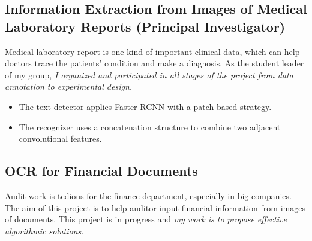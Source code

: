 \documentclass[12pt,letterpaper]{report}
\newcommand{\listitemspace}{0.15em}%
\newenvironment{desp}
{\begin{list}{}{\setlength{\leftmargin}{0em}
			\setlength{\parskip}{0em}
			\setlength{\itemsep}{\listitemspace}
			\setlength{\parsep}{\listitemspace}}}
	{\end{list}}
\begin{document}
	\subsection*{Information Extraction from Images of Medical Laboratory Reports (Principal Investigator)}

	\begin{desp}

		\item Medical laboratory report is one kind of important clinical data, which can help doctors trace the patients’ condition and make a diagnosis. As the student leader of my group, \textit{I organized and participated in all stages of the project from data annotation to experimental design.}
		\begin{itemize}
			\item The text detector applies Faster RCNN with a patch-based strategy.
			\item The recognizer uses a concatenation structure to combine two adjacent convolutional features.
	  \end{itemize}


	\end{desp}

  \subsection*{OCR for Financial Documents}
	\begin{desp}

		\item Audit work is tedious for the finance department, especially in big companies. The aim of this project is to help auditor input financial information from images of documents. This project is in progress and \textit{my work is to propose effective algorithmic solutions.}
	\end{desp}
\end{document}
